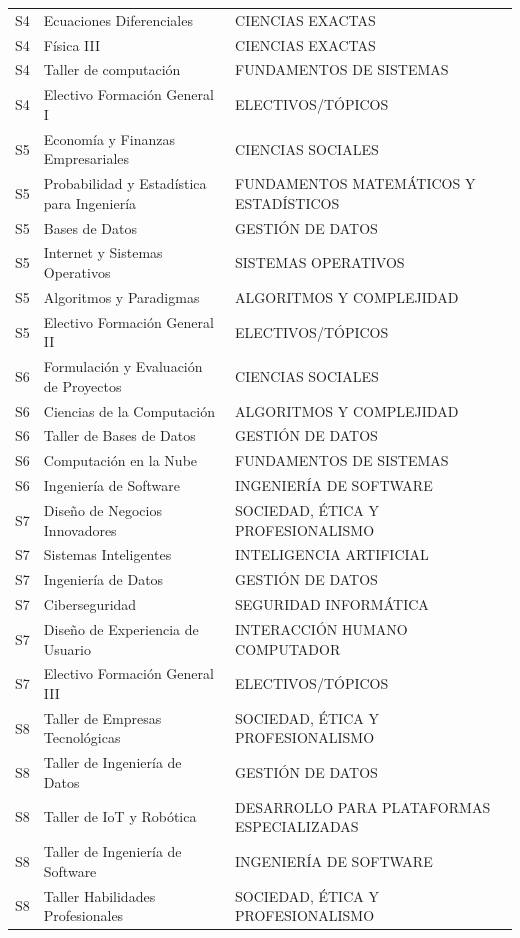 \documentclass[11pt,a4paper]{article}
\begin{document}
\begin{small}
\begin{longtable}{c >{\raggedright\arraybackslash}p{8.5cm} >{\raggedright\arraybackslash}p{5.5cm}}
S4 & Ecuaciones Diferenciales & CIENCIAS EXACTAS \\
S4 & Física III & CIENCIAS EXACTAS \\
S4 & Taller de computación & FUNDAMENTOS DE SISTEMAS \\
S4 & Electivo Formación General I & ELECTIVOS/TÓPICOS \\
S5 & Economía y Finanzas Empresariales & CIENCIAS SOCIALES \\
S5 & Probabilidad y Estadística para Ingeniería & FUNDAMENTOS MATEMÁTICOS Y ESTADÍSTICOS \\
S5 & Bases de Datos & GESTIÓN DE DATOS \\
S5 & Internet y Sistemas Operativos & SISTEMAS OPERATIVOS \\
S5 & Algoritmos y Paradigmas & ALGORITMOS Y COMPLEJIDAD \\
S5 & Electivo Formación General II & ELECTIVOS/TÓPICOS \\
S6 & Formulación y Evaluación de Proyectos & CIENCIAS SOCIALES \\
S6 & Ciencias de la Computación & ALGORITMOS Y COMPLEJIDAD \\
S6 & Taller de Bases de Datos & GESTIÓN DE DATOS \\
S6 & Computación en la Nube & FUNDAMENTOS DE SISTEMAS \\
S6 & Ingeniería de Software & INGENIERÍA DE SOFTWARE \\
S7 & Diseño de Negocios Innovadores & SOCIEDAD, ÉTICA Y PROFESIONALISMO \\
S7 & Sistemas Inteligentes & INTELIGENCIA ARTIFICIAL \\
S7 & Ingeniería de Datos & GESTIÓN DE DATOS \\
S7 & Ciberseguridad & SEGURIDAD INFORMÁTICA \\
S7 & Diseño de Experiencia de Usuario & INTERACCIÓN HUMANO COMPUTADOR \\
S7 & Electivo Formación General III & ELECTIVOS/TÓPICOS \\
S8 & Taller de Empresas Tecnológicas & SOCIEDAD, ÉTICA Y PROFESIONALISMO \\
S8 & Taller de Ingeniería de Datos & GESTIÓN DE DATOS \\
S8 & Taller de IoT y Robótica & DESARROLLO PARA PLATAFORMAS ESPECIALIZADAS \\
S8 & Taller de Ingeniería de Software & INGENIERÍA DE SOFTWARE \\
S8 & Taller Habilidades Profesionales & SOCIEDAD, ÉTICA Y PROFESIONALISMO \\

\end{longtable}
\end{small}
\end{document}
